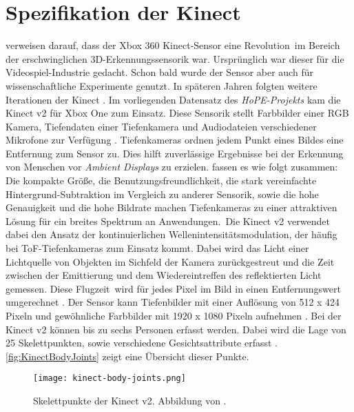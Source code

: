 \section{Spezifikation der Kinect}
\label{2-SpezifikationKinect}
\citet{tolgyessy_evaluation_2021} verweisen darauf,
dass der Xbox 360 Kinect-Sensor eine \glqq Revolution\grqq\ im Bereich der erschwinglichen 3D-Erkennungssensorik war.
Ursprünglich war dieser für die Videospiel-Industrie gedacht.
Schon bald wurde der Sensor aber auch für wissenschaftliche Experimente genutzt.
In späteren Jahren folgten weitere Iterationen der Kinect \citep{tolgyessy_evaluation_2021}.
Im vorliegenden Datensatz des \emph{HoPE-Projekts} kam die Kinect v2 für Xbox One zum Einsatz.
Diese Sensorik stellt Farbbilder einer \ac{RGB} Kamera, Tiefendaten einer Tiefenkamera
und Audiodateien verschiedener Mikrofone zur Verfügung \citep{windows-developer-center_microsoft_corporation_human_2014}.
Tiefenkameras ordnen jedem Punkt eines Bildes eine Entfernung zum Sensor zu.
Dies hilft zuverlässige Ergebnisse bei der Erkennung von Menschen vor \emph{Ambient Displays} zu erzielen.
\citet{li_time-flight_2014} fassen es wie folgt zusammen:
\glqq Die kompakte Größe, die Benutzungsfreundlichkeit,
die stark vereinfachte Hintergrund-Subtraktion im Vergleich zu anderer Sensorik, sowie die hohe Genauigkeit
und die hohe Bildrate machen Tiefenkameras zu einer attraktiven Lösung für ein breites Spektrum an Anwendungen.\grqq\
Die Kinect v2 verwendet dabei den Ansatz der kontinuierlichen Wellenintensitätsmodulation,
der häufig bei \ac{ToF}-Tiefenkameras zum Einsatz kommt.
Dabei wird das Licht einer Lichtquelle von Objekten im Sichfeld der Kamera zurückgestreut
und die Zeit zwischen der Emittierung und dem Wiedereintreffen des reflektierten Licht gemessen.
Diese \glqq Flugzeit\grqq\ wird für jedes Pixel im Bild in einen Entfernungswert umgerechnet \citep{tolgyessy_evaluation_2021}.
Der Sensor kann Tiefenbilder mit einer Auflösung von 512 x 424 Pixeln
und gewöhnliche Farbbilder mit 1920 x 1080 Pixeln aufnehmen \citep{marin_multi-camera_2019}.
Bei der Kinect v2 können bis zu sechs Personen erfasst werden.
Dabei wird die Lage von 25 Skelettpunkten, sowie verschiedene Gesichtsattribute erfasst \citep{windows-developer-center_microsoft_corporation_human_2014}.
\autoref{fig:KinectBodyJoints} zeigt eine Übersicht dieser Punkte. 
\begin{figure}[ht]
  \begin{center}
  \texttt{[image: kinect-body-joints.png]}
  \end{center}
  \caption{Skelettpunkte der Kinect v2. Abbildung von \citet{windows-developer-center_microsoft_corporation_human_2014}.}
  \label{fig:KinectBodyJoints}
\end{figure}

